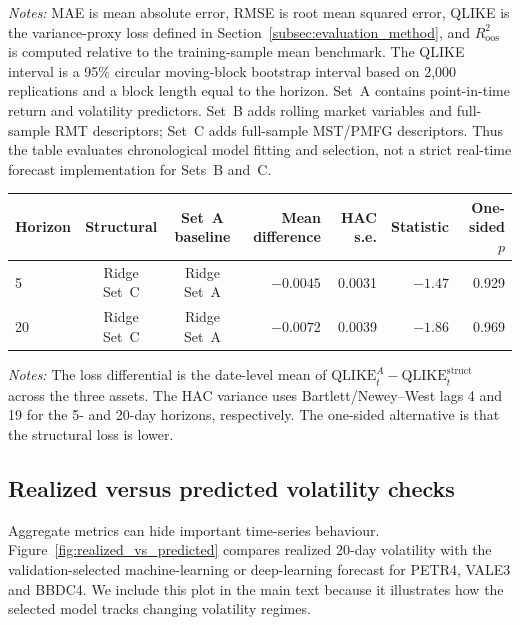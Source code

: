 \noindent\footnotesize\emph{Notes:} MAE is mean absolute error, RMSE is root mean squared error, QLIKE is the variance-proxy loss defined in Section~\ref{subsec:evaluation_method}, and $R^2_{\mathrm{oos}}$ is computed relative to the training-sample mean benchmark. The QLIKE interval is a 95\% circular moving-block bootstrap interval based on 2,000 replications and a block length equal to the horizon. Set~A contains point-in-time return and volatility predictors. Set~B adds rolling market variables and full-sample RMT descriptors; Set~C adds full-sample MST/PMFG descriptors. Thus the table evaluates chronological model fitting and selection, not a strict real-time forecast implementation for Sets~B and~C.
\GlobalPrecisionNote

\normalsize

\begin{center}
\label{tab:forecast_loss_test}
\begin{tabular}{lccrrrr}
\toprule
Horizon & Structural & Set~A baseline & Mean difference & HAC s.e. & Statistic & One-sided $p$ \\
\midrule
5 & Ridge Set~C & Ridge Set~A & $-0.0045$ & 0.0031 & $-1.47$ & 0.929 \\
20 & Ridge Set~C & Ridge Set~A & $-0.0072$ & 0.0039 & $-1.86$ & 0.969 \\
\bottomrule
\end{tabular}
\end{center}

\noindent\footnotesize\emph{Notes:} The loss differential is the date-level mean of $\mathrm{QLIKE}^{A}_t-\mathrm{QLIKE}^{\mathrm{struct}}_t$ across the three assets. The HAC variance uses Bartlett/Newey--West lags 4 and 19 for the 5- and 20-day horizons, respectively. The one-sided alternative is that the structural loss is lower.\GlobalPrecisionNote

\subsection{Realized versus predicted volatility checks}

Aggregate metrics can hide important time-series behaviour. Figure~\ref{fig:realized_vs_predicted} compares realized 20-day volatility with the validation-selected machine-learning or deep-learning forecast for PETR4, VALE3 and BBDC4. We include this plot in the main text because it illustrates how the selected model tracks changing volatility regimes.

